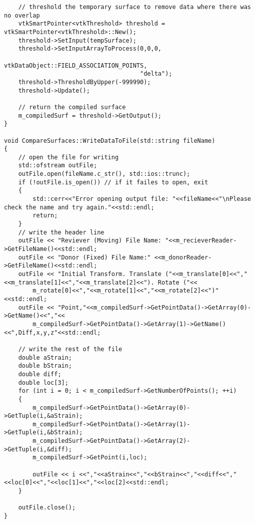 \begin{lstlisting}
    // threshold the temporary surface to remove data where there was no overlap
    vtkSmartPointer<vtkThreshold> threshold = vtkSmartPointer<vtkThreshold>::New();
    threshold->SetInput(tempSurface);
    threshold->SetInputArrayToProcess(0,0,0,
                                      vtkDataObject::FIELD_ASSOCIATION_POINTS,
                                      "delta");
    threshold->ThresholdByUpper(-999990);
    threshold->Update();

    // return the compiled surface
    m_compiledSurf = threshold->GetOutput();
}

void CompareSurfaces::WriteDataToFile(std::string fileName)
{
    // open the file for writing
    std::ofstream outFile;
    outFile.open(fileName.c_str(), std::ios::trunc);
    if (!outFile.is_open()) // if it failes to open, exit
    {
        std::cerr<<"Error opening output file: "<<fileName<<"\nPlease check the name and try again."<<std::endl;
        return;
    }
    // write the header line
    outFile << "Reviever (Moving) File Name: "<<m_recieverReader->GetFileName()<<std::endl;
    outFile << "Donor (Fixed) File Name:" <<m_donorReader->GetFileName()<<std::endl;
    outFile << "Initial Transform. Translate ("<<m_translate[0]<<","<<m_translate[1]<<","<<m_translate[2]<<"). Rotate ("<<
        m_rotate[0]<<","<<m_rotate[1]<<","<<m_rotate[2]<<")"<<std::endl;
    outFile << "Point,"<<m_compiledSurf->GetPointData()->GetArray(0)->GetName()<<","<<
        m_compiledSurf->GetPointData()->GetArray(1)->GetName()<<",Diff,x,y,z"<<std::endl;

    // write the rest of the file
    double aStrain;
    double bStrain;
    double diff;
    double loc[3];
    for (int i = 0; i < m_compiledSurf->GetNumberOfPoints(); ++i)
    {
        m_compiledSurf->GetPointData()->GetArray(0)->GetTuple(i,&aStrain);
        m_compiledSurf->GetPointData()->GetArray(1)->GetTuple(i,&bStrain);
        m_compiledSurf->GetPointData()->GetArray(2)->GetTuple(i,&diff);
        m_compiledSurf->GetPoint(i,loc);

        outFile << i <<","<<aStrain<<","<<bStrain<<","<<diff<<","<<loc[0]<<","<<loc[1]<<","<<loc[2]<<std::endl;
    }

    outFile.close();
}
\end{lstlisting}
